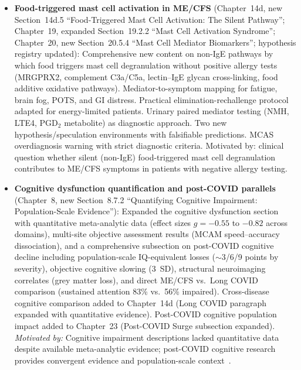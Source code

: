 \begin{itemize}
  \item \textbf{Food-triggered mast cell activation in ME/CFS}
    (Chapter~14d, new Section~14d.5 ``Food-Triggered Mast Cell Activation: The
    Silent Pathway''; Chapter~19, expanded Section~19.2.2 ``Mast Cell Activation
    Syndrome''; Chapter~20, new Section~20.5.4 ``Mast Cell Mediator Biomarkers'';
    hypothesis registry updated): Comprehensive new content on non-IgE pathways
    by which food triggers mast cell degranulation without positive allergy tests
    (MRGPRX2, complement C3a/C5a, lectin--IgE glycan cross-linking, food additive
    oxidative pathways). Mediator-to-symptom mapping for fatigue, brain fog, POTS,
    and GI distress. Practical elimination-rechallenge protocol adapted for
    energy-limited patients. Urinary paired mediator testing (NMH, LTE4,
    PGD$_2$ metabolite) as diagnostic approach. Two new hypothesis/speculation
    environments with falsifiable predictions. MCAS overdiagnosis warning with
    strict diagnostic criteria.
    Motivated by: clinical question whether silent (non-IgE) food-triggered mast
    cell degranulation contributes to ME/CFS symptoms in patients with negative
    allergy testing.
    \cite{Rohrhofer2025mecfsmast,Kohno2021potsmast,Roy2021mrgprx2,%
    Thapaliya2022mrgprx2neuro,EliehAliKomi2020complement,%
    ComasBaste2020histamine,Folkerts2018fiber,Voelker2025biomarkersmast,%
    Voelker2024urinemast,Castells2024mcasreview,Gulen2024mcascriteria,%
    Maeda2017pgdm,Rohrhofer2024stratification,Tsilioni2022exosome,%
    Hatziagelaki2018hypothalamus,Pepper2020additives,Weinstock2023MCASneuro}

  \item \textbf{Cognitive dysfunction quantification and post-COVID parallels}
    (Chapter~8, new Section~8.7.2 ``Quantifying Cognitive Impairment:
    Population-Scale Evidence''): Expanded the cognitive dysfunction section with
    quantitative meta-analytic data (effect sizes $g = -0.55$ to $-0.82$ across
    domains), multi-site objective assessment results (MCAM speed--accuracy
    dissociation), and a comprehensive subsection on post-COVID cognitive decline
    including population-scale IQ-equivalent losses ($\sim$3/6/9 points by
    severity), objective cognitive slowing (3~SD), structural neuroimaging
    correlates (grey matter loss), and direct ME/CFS vs.\ Long COVID comparison
    (sustained attention 83\% vs.\ 56\% impaired). Cross-disease cognitive
    comparison added to Chapter~14d (Long COVID paragraph expanded with
    quantitative evidence). Post-COVID cognitive population impact added to
    Chapter~23 (Post-COVID Surge subsection expanded).
    \textit{Motivated by:} Cognitive impairment descriptions lacked quantitative
    data despite available meta-analytic evidence; post-COVID cognitive research
    provides convergent evidence and population-scale
    context~\cite{Hampshire2024cognition,Sebaiti2022cognitive,Lange2024cognitive,Zhao2024cognitive,Douaud2022brain,Azcue2022brainfog}.


\end{itemize}
